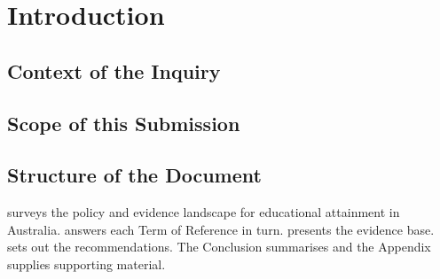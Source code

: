 \chapter{Introduction}
\label{ch:introduction}


\section{Context of the Inquiry}
\label{sec:intro:context}

\lipsum[1-2]

\section{Scope of this Submission}
\label{sec:intro:scope}

\lipsum[3]

\section{Structure of the Document}
\label{sec:intro:structure}

 surveys the policy and evidence landscape for educational attainment in Australia.  answers each Term of Reference in turn.  presents the evidence base.  sets out the recommendations. The Conclusion summarises and the Appendix supplies supporting material.

